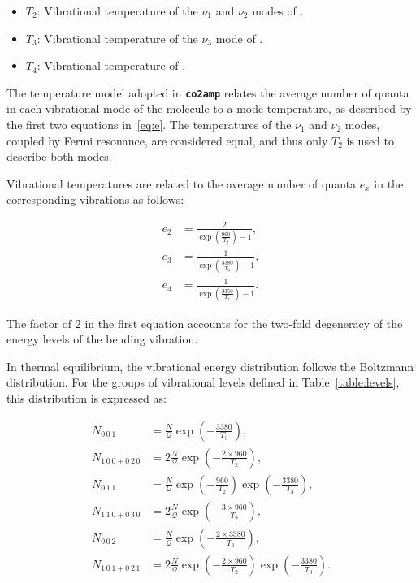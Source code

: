 \begin{itemize}
    \item $T_2$: Vibrational temperature of the $\nu_1$ and $\nu_2$ modes of .
    \item $T_3$: Vibrational temperature of the $\nu_3$ mode of .
    \item $T_4$: Vibrational temperature of .
\end{itemize}

The temperature model adopted in \textbf{\texttt{co2amp}} relates the average number of quanta in each vibrational mode of the  molecule to a mode temperature, as described by the first two equations in~\ref{eq:e}. The temperatures of the $\nu_1$ and $\nu_2$ modes, coupled by Fermi resonance, are considered equal, and thus only $T_2$ is used to describe both modes.

Vibrational temperatures are related to the average number of quanta $e_x$ in the corresponding vibrations as follows:

\begin{equation}\label{eq:e}
\begin{aligned}
e_2 &= \frac{2}{\exp\left(\frac{960}{T_2}\right)-1}, \\
e_3 &= \frac{1}{\exp\left(\frac{3380}{T_3}\right)-1}, \\
e_4 &= \frac{1}{\exp\left(\frac{3350}{T_4}\right)-1}.
\end{aligned}
\end{equation}

The factor of 2 in the first equation accounts for the two-fold degeneracy of the energy levels of the bending vibration.

In thermal equilibrium, the vibrational energy distribution follows the Boltzmann distribution. For the groups of vibrational levels defined in Table~\ref{table:levels}, this distribution is expressed as:

\begin{equation}\label{eq:Boltzman}
\begin{aligned}
N_{0\,0\,1}           &=   \frac{N}{\mathcal{Q}} \exp\left(-\frac{3380}{T_3}\right), \\
N_{1\,0\,0 + 0\,2\,0} &= 2 \frac{N}{\mathcal{Q}} \exp\left(-\frac{2 \times 960}{T_2}\right), \\
N_{0\,1\,1}           &=   \frac{N}{\mathcal{Q}} \exp\left(-\frac{960}{T_2}\right) \exp\left(-\frac{3380}{T_3}\right), \\
N_{1\,1\,0 + 0\,3\,0} &= 2 \frac{N}{\mathcal{Q}} \exp\left(-\frac{3 \times 960}{T_2}\right), \\
N_{0\,0\,2}           &=   \frac{N}{\mathcal{Q}} \exp\left(-\frac{2 \times 3380}{T_3}\right), \\
N_{1\,0\,1 + 0\,2\,1} &= 2 \frac{N}{\mathcal{Q}} \exp\left(-\frac{2 \times 960}{T_2}\right) \exp\left(-\frac{3380}{T_3}\right).
\end{aligned}
\end{equation}

